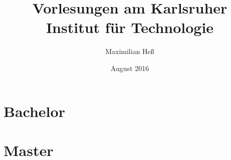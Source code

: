 \documentclass[a4paper,8pt,titlepage]{scrbook}
\title{Vorlesungen am Karlsruher Institut für Technologie}
\author{Maximilian Heß}
\date{August 2016}
\begin{document}
\maketitle
\tableofcontents

\part{Bachelor}










\part{Master}





\end{document}
